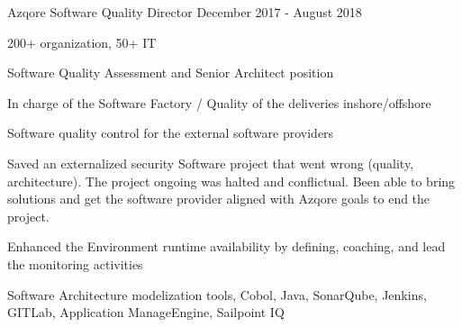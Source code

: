 \begin{cventries}
        \cventry
        {} %
        {} %
        {} %
        {} %
        {
            \globalexperience
            {Azqore} %
            {Software Quality Director} %
            {December 2017 - August 2018} %
            {
                \begin{cvitems} %
                    \item{200+ organization, 50+ IT}
                    \item{Software Quality Assessment and Senior Architect position}
                    \item{In charge of the Software Factory  / Quality of the deliveries inshore/offshore}
                    \item{Software quality control for the external software providers}
                \end{cvitems}
            }
            {
                \begin{cvitems} %
                    \item{Saved an externalized security Software project that went wrong (quality, architecture). The project ongoing was halted and conflictual. Been able to bring solutions and get the software provider aligned with Azqore goals to end the project.}
                    \item{Enhanced the Environment runtime availability by defining, coaching, and lead the monitoring activities}
                \end{cvitems}
            }
            {
                \begin{cvitems} %
                    \item{Software Architecture modelization tools, Cobol, Java, SonarQube, Jenkins, GITLab, Application ManageEngine, Sailpoint IQ }
                \end{cvitems}
            }
        }


\end{cventries}
